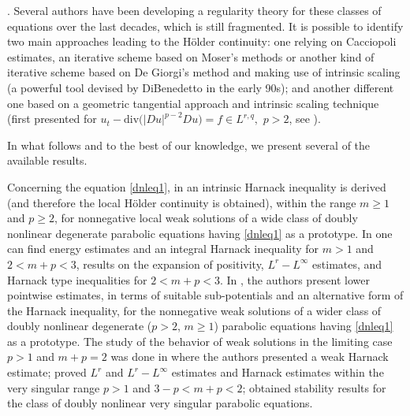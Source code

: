 \documentclass[a4paper,11pt,fullpage]{article}
\numberwithin{equation}{section}
\begin{document}
 \vskip0.3cm 

\vskip0.2cm . Several authors have been developing a regularity theory for these classes of equations over the last decades, which is still fragmented. It is possible to identify two main approaches leading to the H\"older continuity: one relying on Cacciopoli estimates, an iterative scheme based on Moser's methods or another kind of iterative scheme based on De Giorgi's method and making use of intrinsic scaling (a powerful tool devised by DiBenedetto in the early 90s); and another different one based on a geometric tangential approach and intrinsic scaling technique (first presented for $u_t-\textrm{div} \big(|Du|^{p-2} Du\big)=f \in L^{r,q} ,$ $p>2$, see \cite{TU14}).

\noindent In what follows and to the best of our knowledge, we present several of the available results. 

\vspace{.1cm}


Concerning the equation \eqref{dnleq1}, in \cite{FornaroS} an intrinsic Harnack inequality is derived (and therefore the local H\"older continuity is obtained), within the range $m\geqslant 1$ and $p\geqslant 2$, for nonnegative local weak solutions of a wide class of doubly nonlinear degenerate parabolic equations having \eqref{dnleq1} as a prototype.  In \cite{FoSoVe, FoSoVe2, FoSoVe3} one can find energy estimates and an integral Harnack inequality for $m>1$ and $2<m+p<3$, results on the expansion of positivity, $L^r-L^\infty$ estimates, and Harnack type inequalities for  $2<m+p<3$. In \cite{FornGian10}, the authors present lower pointwise estimates, in terms of suitable sub-potentials and an alternative form of the Harnack inequality, for the nonnegative weak solutions of a wider class of doubly nonlinear degenerate ($p>2$, $m \geqslant 1$) parabolic equations having \eqref{dnleq1} as a prototype. The study of the behavior of weak solutions in the limiting case $p>1$ and $m+p = 2$ was done in \cite{FoHeVe, FoHeVe1, FoHeVe2} where the authors presented a weak Harnack estimate; proved $L^r$ and $L^r-L^\infty$ estimates and Harnack estimates within the very singular range $p>1$ and $3-p <m+p <2$; obtained stability results for the class of doubly nonlinear very singular parabolic equations. 
\end{document}
